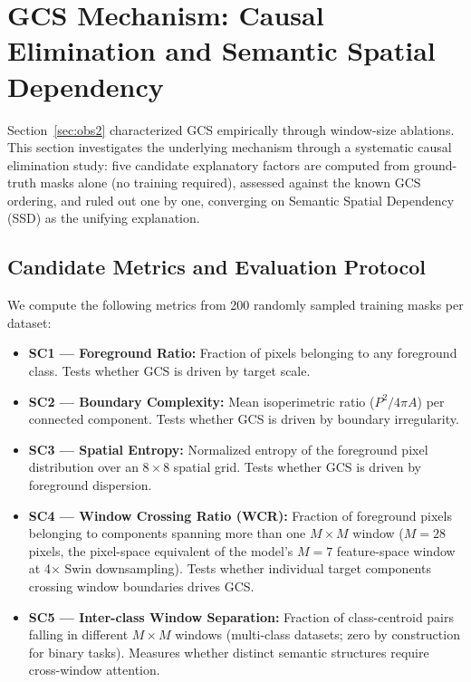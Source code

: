 \section{GCS Mechanism: Causal Elimination and Semantic Spatial Dependency}
\label{sec:gcs_mechanism}

Section~\ref{sec:obs2} characterized GCS empirically through window-size ablations. This section investigates the underlying mechanism through a systematic causal elimination study: five candidate explanatory factors are computed from ground-truth masks alone (no training required), assessed against the known GCS ordering, and ruled out one by one, converging on Semantic Spatial Dependency (SSD) as the unifying explanation.

\subsection{Candidate Metrics and Evaluation Protocol}

We compute the following metrics from 200 randomly sampled training masks per dataset:

\begin{itemize}
  \item \textbf{SC1 --- Foreground Ratio:} Fraction of pixels belonging to any foreground class. Tests whether GCS is driven by target scale.
  \item \textbf{SC2 --- Boundary Complexity:} Mean isoperimetric ratio ($P^2/4\pi A$) per connected component. Tests whether GCS is driven by boundary irregularity.
  \item \textbf{SC3 --- Spatial Entropy:} Normalized entropy of the foreground pixel distribution over an $8{\times}8$ spatial grid. Tests whether GCS is driven by foreground dispersion.
  \item \textbf{SC4 --- Window Crossing Ratio (WCR):} Fraction of foreground pixels belonging to components spanning more than one $M{\times}M$ window ($M{=}28$ pixels, the pixel-space equivalent of the model's $M{=}7$ feature-space window at 4${\times}$ Swin downsampling). Tests whether individual target components crossing window boundaries drives GCS.
  \item \textbf{SC5 --- Inter-class Window Separation:} Fraction of class-centroid pairs falling in different $M{\times}M$ windows (multi-class datasets; zero by construction for binary tasks). Measures whether distinct semantic structures require cross-window attention.
\end{itemize}

